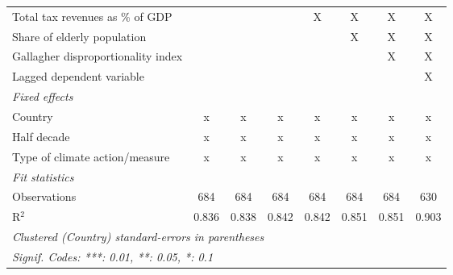 \begin{table}[htbp]
\begin{tabular}{lccccccc}
      Total tax revenues as \% of GDP                                         &                &                &                & X              & X             & X             & X\\  
      Share of elderly population                                             &                &                &                &                & X             & X             & X\\  
      Gallagher disproportionality index                                      &                &                &                &                &               & X             & X\\  
      Lagged dependent variable                                               &                &                &                &                &               &               & X\\  
      \emph{Fixed effects}\\
      Country                                                                 & x              & x              & x              & x              & x             & x             & x\\  
      Half decade                                                             & x              & x              & x              & x              & x             & x             & x\\  
      Type of climate action/measure                                          & x              & x              & x              & x              & x             & x             & x\\  
      \midrule \emph{Fit statistics}\\
      Observations                                                            & 684            & 684            & 684            & 684            & 684           & 684           & 630\\  
      R$^2$                                                                   & 0.836          & 0.838          & 0.842          & 0.842          & 0.851         & 0.851         & 0.903\\  
      \midrule
      \multicolumn{8}{l}{\emph{Clustered (Country) standard-errors in parentheses}}\\
      \multicolumn{8}{l}{\emph{Signif. Codes: ***: 0.01, **: 0.05, *: 0.1}}\\
   \end{tabular}
\end{table}


